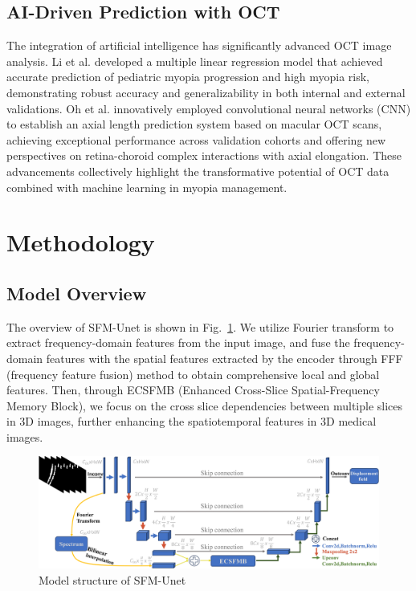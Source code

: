 \documentclass[AMA,Times1COL]{WileyNJDv5} %
\begin{document}
\subsection{AI-Driven Prediction with OCT}
The integration of artificial intelligence has significantly advanced OCT image analysis\cite{zuo2025machine}. Li et al. \cite{li2024accurate} developed a multiple linear regression model that achieved accurate prediction of pediatric myopia progression and high myopia risk, demonstrating robust accuracy and generalizability in both internal and external validations. Oh et al. \cite{oh2024prediction} innovatively employed convolutional neural networks (CNN) to establish an axial length prediction system based on macular OCT scans, achieving exceptional performance across validation cohorts and offering new perspectives on retina-choroid complex interactions with axial elongation. These advancements collectively highlight the transformative potential of OCT data combined with machine learning in myopia management.

\section{Methodology}
\subsection{Model Overview}
The overview of SFM-Unet is shown in Fig.~\ref{fig:1}. We utilize Fourier transform to extract frequency-domain features from the input image, and fuse the frequency-domain features with the spatial features extracted by the encoder through FFF (frequency feature fusion) method to obtain comprehensive local and global features. Then, through ECSFMB (Enhanced Cross-Slice Spatial-Frequency Memory Block), we focus on the cross slice dependencies between multiple slices in 3D images, further enhancing the spatiotemporal features in 3D medical images.

\begin{figure}[htbp]
\centerline{\includegraphics[width=0.95\linewidth]{Fig/fig1.png}}
\caption{Model structure of SFM-Unet}
\label{fig:1}
\end{figure}
\end{document}
